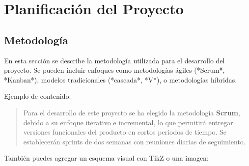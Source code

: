 \chapter{Planificación del Proyecto}



\section{Metodología}

En esta sección se describe la metodología utilizada para el desarrollo del proyecto. Se pueden incluir enfoques como metodologías ágiles (*Scrum*, *Kanban*), modelos tradicionales (*cascada*, *V*), o metodologías híbridas. 

Ejemplo de contenido:
\begin{quote}
	Para el desarrollo de este proyecto se ha elegido la metodología \textbf{Scrum}, debido a su enfoque iterativo e incremental, lo que permitirá entregar versiones funcionales del producto en cortos periodos de tiempo. Se establecerán sprints de dos semanas con reuniones diarias de seguimiento.
\end{quote}

También puedes agregar un esquema visual con TikZ o una imagen:

\begin{center}
	\begin{otherlanguage}{english} %
	\end{otherlanguage} %
\end{center}





